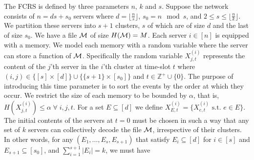 \documentclass[journal,onecolumn,draftcls]{IEEEtran}
\begin{document}
The FCRS is defined by three parameters $n$, $k$ and $s$. Suppose the network consists of $n = ds + s_0$ servers where $d = \lfloor\frac{n}{s}\rfloor$, $s_0 = n \mod s$, and $2\le s\le\lfloor\frac{n}{k}\rfloor$. We partition these servers into $s+1$ clusters, $s$ of which are of size $d$ and the last of size $s_0$. We have a file ${\cal M}$ of size $H({\cal M}) = M$. Each server $i\in[n]$ is equipped with a memory. We model each memory with a random variable where the server can store a function of ${\cal M}$. Specifically the random variable $X^{(i)}_{j,t}$ represents the content of the $j$'th server in the $i$'th cluster at time-slot $t$ where $(i,j)\in \{[s]\times [d]\} \cup \{\{s+1\}\times[s_0]\}$ and $t\in\mathbb{Z}^+\cup\{0\}$. The purpose of introducing this time parameter is to sort the events by the order at which they occur. We restrict the size of each memory to be bounded by $\alpha$, that is, $H(X^{(i)}_{j,t}) \le \alpha \; \forall  \; i,j,t$. %
 For a set $E\subseteq [d]$ we define $X^{(i)}_{E,t} = \{X^{(i)}_{e,t} \mbox{ s.t. } e\in E\}$. The initial contents of the servers at $t = 0$ must be chosen in such a way that any set of $k$ servers can collectively decode the file ${\cal M}$, irrespective of their clusters. In other words, for any $(E_1,\dots, E_s,E_{s+1})$ that satisfy $E_i\subseteq [d]$ for $i\in[s]$ and $E_{s+1}\subseteq[s_0]$, and $\sum_{i=1}^{s+1} |E_i| = k$, we must have
\end{document}
